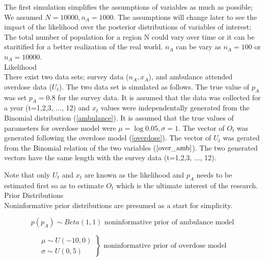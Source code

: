 \documentclass[
10pt, %
a4paper, %
oneside, %
headinclude,footinclude, %
BCOR5mm, %
]{scrartcl}
\begin{document}
\normalsize 
The first simulation simplifies the assumptions of variables as much as possible; We assumed $N= 10000, n_{A}=1000$. The assumptions will change later to see the impact of the likelihood over the posterior distributions of variables of interest; The total number of population for a region N could vary over time or it can be staritified for a better realization of the real world. $n_A$ can be vary as $n_{A}=100$ or $n_{A}=10000$.  \\



\LARGE Likelihood\\

\normalsize 
There exist two data sets; survey data ($n_A, x_A$), and ambulance attended overdose data ($U_t$). The two data set is simulated as follows.
The true value of $p_A$ was set $p_A=0.8$ for the survey data.
It is assumed that the data was collected for a year (t=1,2,3, ..., 12) and 
$x_t$ values were independentally generated from the Binomial distribution (\ref{ambulance}). It is assumed that the true values of parameters for overdose model were $\mu=\log0.05, \sigma=1$.
The vector of $O_t$ was generated following the overdose model (\ref{overdose}). The vector of $U_t$ was gerated from the Binomial relation of the two variables ($\ref{over_amb}$). The two generated vectors have the same length with the survey data (t=1,2,3, ..., 12).

Note that only $U_t$ and $x_t$ are known as the likelihood and $p_A$ needs to be estimated first so as to estimate $O_t$ which is the ultimate interest of the research.\\

\Large Prior Distributions\\

\normalsize Noninformative prior distributions are presumed as a start for simplicity. 

\begin{equation}
\label{nonin_prior_amb}
p(p_A) \sim Beta(1,1)
\text{			noninformative prior of ambulance model}
\end{equation} 

\begin{equation}
\label{noninprior_over}
\left.\begin{aligned}
\mu \sim U(-10,0)\\
\sigma \sim U(0,5)
\end{aligned}\right\} 
\text{			noninformative prior of overdose model}
\end{equation}
\end{document}
